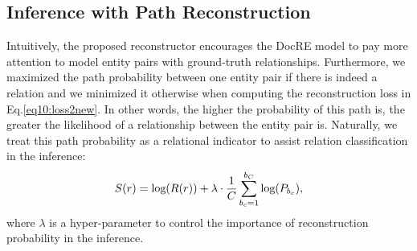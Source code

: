 \documentclass[letterpaper]{article} \usepackage{aaai21}  \usepackage{times}  \usepackage{helvet} \usepackage{courier}  \usepackage[hyphens]{url}  \usepackage{graphicx} \urlstyle{rm} \def\UrlFont{\rm}  \usepackage{natbib}  \usepackage{caption} \frenchspacing  \setlength{\pdfpagewidth}{8.5in}  \setlength{\pdfpageheight}{11in}  \usepackage{amsmath}
\begin{document}
\subsection{Inference with Path Reconstruction}
Intuitively, the proposed reconstructor encourages the DocRE model to pay more attention to model entity pairs with ground-truth relationships.
Furthermore, we maximized the path probability between one entity pair if there is indeed a relation and we minimized it otherwise when computing the reconstruction loss in Eq.\eqref{eq10:loss2new}.
In other words, the higher the probability of this path is, the greater the likelihood of a relationship between the entity pair is.
Naturally, we treat this path probability as a relational indicator to assist relation classification in the inference:
\begin{equation}
\begin{split}
S(r) = \textup{log}(R(r)) + \lambda \cdot \frac{1}{C}\sum_{b_c=1}^{b_C}\textup{log}(P_{b_c}),
\label{eq13:relationscores}
\end{split}
\end{equation}where $\lambda$ is a hyper-parameter to control the importance of reconstruction probability in the inference. 
\end{document}
